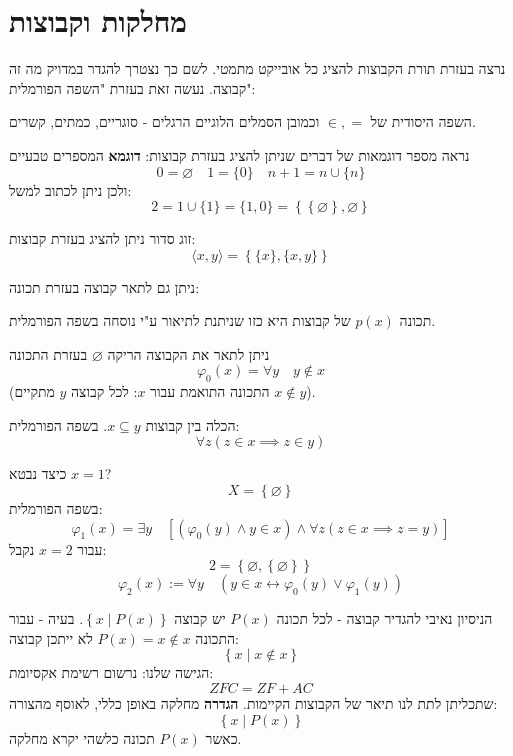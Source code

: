 \documentclass{tstextbook}
\begin{document}

\section{מחלקות וקבוצות}

נרצה בעזרת תורת הקבוצות להציג כל אובייקט מתמטי. לשם כך נצטרך להגדר במדויק מה זה קבוצה. נעשה זאת בעזרת "השפה הפורמלית":

\begin{definition}
השפה היסודית של \(\in, =\) וכמובן הסמלים הלוגיים הרגלים - סוגריים, כמתים, קשרים.

\end{definition}
נראה מספר דוגמאות של דברים שניתן להציג בעזרת קבוצות:
\textbf{דוגמא}
המספרים טבעיים
$$0 = \varnothing \quad 1 = \{ 0 \}\quad n+1=n\cup \{ n \}$$
ולכן ניתן לכתוב למשל:
$$2=1 \cup \{ 1 \} = \{ 1,0 \}=\left\{  \left\{  \varnothing   \right\},\varnothing   
\right\}$$

\begin{example}
זוג סדור ניתן להציג בעזרת קבוצות:
$$\langle x,y \rangle =\left\{  \{ x \},\{ x,y \}  \right\}$$

\end{example}
ניתן גם לתאר קבוצה בעזרת תכונה:

\begin{definition}
תכונה \(p(x)\) של קבוצות היא כזו שניתנת לתיאור ע"י נוסחה בשפה הפורמלית.

\end{definition}
\begin{example}
ניתן לתאר את הקבוצה הריקה \(\varnothing\) בעזרת התכונה
$$\varphi_{0}(x)= \forall y\quad y \not \in x$$
(התכונה התואמת עבור \(x\): לכל קבוצה \(y\) מתקיים \(x\not \in y\)).

\end{example}
\begin{example}
הכלה בין קבוצות \(x\subseteq y\). בשפה הפורמלית:
$$\forall z\left( z \in x \implies z \in y \right)$$

\end{example}
\begin{example}
כיצד נבטא \(x=1\)?
$$X=\left\{  \varnothing   \right\}$$
בשפה הפורמלית:
$$\varphi_{1}(x)= \exists y\quad \left[ \left( \varphi_{0}(y)\land y \in x \right) \land  \forall z \left( z \in x\implies z = y \right)\right]$$
עבור \(x=2\) נקבל:
$$2=\left\{  \varnothing ,\left\{  \varnothing   \right\}  \right\}$$$$\varphi_{2}\left(x\right):=\forall y\quad\left(y\in x\leftrightarrow\varphi_{0}\left(y\right)\vee\varphi_{1}\left(y\right)\right)$$

\end{example}
הניסיון נאיבי להגדיר קבוצה - לכל תכונה \(P(x)\) יש קבוצה \(\left\{  x \mid P(x)  \right\}\).
בעיה - עבור התכונה \(P(x)=x \not \in x\) לא ייתכן קבוצה:
$$\left\{  x\mid x \not  \in x  \right\}$$
הגישה שלנו: נרשום רשימת אקסיומת:
$$ZFC = ZF+AC$$
שתכליתן לתת לנו תיאר של הקבוצות הקיימות.
\textbf{הגדרה} מחלקה
באופן כללי, לאוסף מהצורה:
$$\left\{  x\mid P(x)  \right\}$$
כאשר \(P(x)\) תכונה כלשהי יקרא מחלקה.
\end{document}
